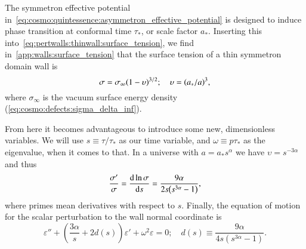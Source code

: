 




\newcommand{\eqregimenum}{\ALIASeqregimenum}






The symmetron effective potential in~\cref{eq:cosmo:quintessence:asymmetron_effective_potential} is designed to induce phase transition at conformal time $\tau_\ast$, or scale factor $a_\ast$. Inserting this into~\cref{eq:pertwalls:thinwall:surface_tension}, we find in~\cref{app:walls:surface_tension} that the surface tension of a thin symmetron domain wall is
\begin{equation}
    \sigma = \sigma_\infty {\left( 1 -\upsilon  \right)}^{3/2}; \quad \upsilon={\left( a_\ast/a \right)}^3,
\end{equation}
where $\sigma_\infty$ is the vacuum surface energy density (\cref{eq:cosmo:defects:sigma_delta_inf}). 

From here it becomes advantageous to introduce some new, dimensionless variables. %
We will use $s\equiv \tau/\tau_\ast$ as our time variable, and $\omega \equiv p\tau_\ast$ as the eigenvalue, when it comes to that. In a universe with $a = a_\ast s^\alpha$ we have $\upsilon = s^{-3\alpha}$ and thus  %
\begin{equation}
    \frac{\sigma '}{\sigma} 
    = \dv{\ln{\sigma}}{s} = \frac{9\alpha}{2s{\left( s^{3\alpha} -1  \right)}},
\end{equation}
where primes mean derivatives with respect to $s$. %
Finally, the equation of motion for the scalar perturbation to the wall normal coordinate is
\begin{equation}\label{eq:pertwalls:mywalls:eom_final}
    \varepsilon'' + \left(  \frac{3\alpha}{s}  + 2 d(s)\right)\varepsilon' + \omega^2\varepsilon = 0; \quad d(s)\equiv \frac{9\alpha}{4 s \left( s^{3\alpha}-1 \right)}.
\end{equation}

